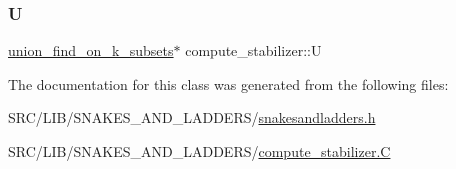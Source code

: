 \mbox{\label{classcompute__stabilizer_a23c77f55b495ba15ee411ebc737ee29e}} 
\subsubsection{\texorpdfstring{U}{U}}
{\footnotesize\ttfamily \mbox{\hyperlink{classunion__find__on__k__subsets}{union\+\_\+find\+\_\+on\+\_\+k\+\_\+subsets}}$\ast$ compute\+\_\+stabilizer\+::U}



The documentation for this class was generated from the following files\+:\begin{DoxyCompactItemize}
\item 
S\+R\+C/\+L\+I\+B/\+S\+N\+A\+K\+E\+S\+\_\+\+A\+N\+D\+\_\+\+L\+A\+D\+D\+E\+R\+S/\mbox{\hyperlink{snakesandladders_8h}{snakesandladders.\+h}}\item 
S\+R\+C/\+L\+I\+B/\+S\+N\+A\+K\+E\+S\+\_\+\+A\+N\+D\+\_\+\+L\+A\+D\+D\+E\+R\+S/\mbox{\hyperlink{compute__stabilizer_8_c}{compute\+\_\+stabilizer.\+C}}\end{DoxyCompactItemize}
